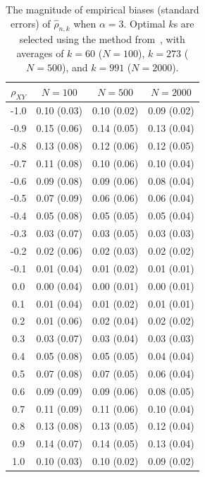 \documentclass[lineno]{biometrika}
\newcommand \ag{\alpha}
\begin{document}
\begin{table}[ht]
\centering
\caption{The magnitude of empirical biases (standard errors) of $\hat{\rho}_{n,k}$ when $\ag=3$. Optimal $k$s are selected using the method from~\citet{clauset:shalizi:newman:2009}, with averages of $k=60$ ($N=100$), $k=273$ ($N=500$), and  $k=991$ ($N=2000$).
\label{t:sim5}}
\medskip
\begin{tabular}{cccc}
  \hline\hline
 $\rho_{XY}$ & $N=100$ &  $N=500$ & $N=2000$  \\
  \hline
-1.0 & 0.10 (0.03) & 0.10 (0.02) & 0.09 (0.02) \\
-0.9 & 0.15 (0.06) & 0.14 (0.05) & 0.13 (0.04) \\
-0.8 & 0.13 (0.08) & 0.12 (0.06) & 0.12 (0.05) \\
-0.7 & 0.11 (0.08) & 0.10 (0.06) & 0.10 (0.04) \\
-0.6 & 0.09 (0.08) & 0.09 (0.06) & 0.08 (0.04) \\
-0.5 & 0.07 (0.09) & 0.06 (0.06) & 0.06 (0.04) \\
-0.4 & 0.05 (0.08) & 0.05 (0.05) & 0.05 (0.04) \\
-0.3 & 0.03 (0.07) & 0.03 (0.05) & 0.03 (0.03) \\
-0.2 & 0.02 (0.06) & 0.02 (0.03) & 0.02 (0.02) \\
-0.1 & 0.01 (0.04) & 0.01 (0.02) & 0.01 (0.01) \\
0.0 & 0.00 (0.04) & 0.00 (0.01) & 0.00 (0.01) \\
0.1 & 0.01 (0.04) & 0.01 (0.02) & 0.01 (0.01) \\
0.2 & 0.01 (0.06) & 0.02 (0.04) & 0.02 (0.02) \\
0.3 & 0.03 (0.07) & 0.03 (0.04) & 0.03 (0.03) \\
0.4 & 0.05 (0.08) & 0.05 (0.05) & 0.04 (0.04) \\
0.5 & 0.07 (0.08) & 0.07 (0.05) & 0.06 (0.04) \\
0.6 & 0.09 (0.09) & 0.09 (0.06) & 0.08 (0.05) \\
0.7 & 0.11 (0.09) & 0.11 (0.06) & 0.10 (0.04) \\
0.8 & 0.13 (0.08) & 0.13 (0.05) & 0.12 (0.04) \\
0.9 & 0.14 (0.07) & 0.14 (0.05) & 0.13 (0.04) \\
1.0 & 0.10 (0.03) & 0.10 (0.02) & 0.09 (0.02) \\
\hline\hline
\end{tabular}
\end{table}
\end{document}

